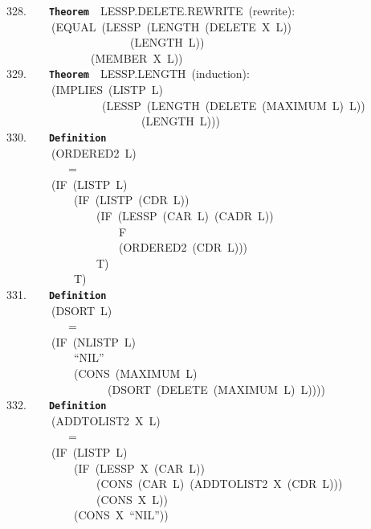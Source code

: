 \documentclass[11pt]{book}
\newenvironment{pubasis}{\begin{flushleft}\ttfamily\small}{\normalsize\rmfamily\end{flushleft}}
\newcommand{\axiomordefinition}[1]{\vspace{6pt}\texttt{\textbf{#1}}}
\begin{document}
\begin{pubasis}
328.~~~~\axiomordefinition{Theorem}~~LESSP.DELETE.REWRITE~(rewrite):\\
~~~~~~~~(EQUAL~(LESSP~(LENGTH~(DELETE~X~L))\\
~~~~~~~~~~~~~~~~~~~~~~(LENGTH~L))\\
~~~~~~~~~~~~~~~(MEMBER~X~L))\\

329.~~~~\axiomordefinition{Theorem}~~LESSP.LENGTH~(induction):\\
~~~~~~~~(IMPLIES~(LISTP~L)\\
~~~~~~~~~~~~~~~~~(LESSP~(LENGTH~(DELETE~(MAXIMUM~L)~L))\\
~~~~~~~~~~~~~~~~~~~~~~~~(LENGTH~L)))\\

330.~~~~\axiomordefinition{Definition}\\
~~~~~~~~(ORDERED2~L)\\
~~~~~~~~~~~=\\
~~~~~~~~(IF~(LISTP~L)\\
~~~~~~~~~~~~(IF~(LISTP~(CDR~L))\\
~~~~~~~~~~~~~~~~(IF~(LESSP~(CAR~L)~(CADR~L))\\
~~~~~~~~~~~~~~~~~~~~F\\
~~~~~~~~~~~~~~~~~~~~(ORDERED2~(CDR~L)))\\
~~~~~~~~~~~~~~~~T)\\
~~~~~~~~~~~~T)\\

331.~~~~\axiomordefinition{Definition}\\
~~~~~~~~(DSORT~L)\\
~~~~~~~~~~~=\\
~~~~~~~~(IF~(NLISTP~L)\\
~~~~~~~~~~~~``NIL''\\
~~~~~~~~~~~~(CONS~(MAXIMUM~L)\\
~~~~~~~~~~~~~~~~~~(DSORT~(DELETE~(MAXIMUM~L)~L))))\\

332.~~~~\axiomordefinition{Definition}\\
~~~~~~~~(ADDTOLIST2~X~L)\\
~~~~~~~~~~~=\\
~~~~~~~~(IF~(LISTP~L)\\
~~~~~~~~~~~~(IF~(LESSP~X~(CAR~L))\\
~~~~~~~~~~~~~~~~(CONS~(CAR~L)~(ADDTOLIST2~X~(CDR~L)))\\
~~~~~~~~~~~~~~~~(CONS~X~L))\\
~~~~~~~~~~~~(CONS~X~``NIL''))\\


\end{pubasis}
\end{document}
